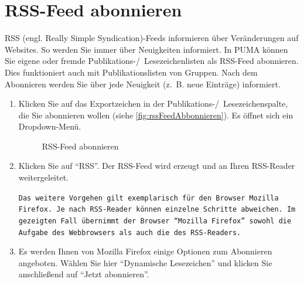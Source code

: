 \section{RSS-Feed abonnieren} 
\label{sec:rssFeedAbonnieren}
RSS (engl. Really Simple Syndication)-Feeds informieren über Veränderungen auf Websites. So werden Sie immer über Neuigkeiten informiert. In PUMA können Sie eigene oder fremde Publikations-/~Lesezeichenlisten als RSS-Feed abonnieren. Dies funktioniert auch mit Publikationslisten von Gruppen. Nach dem Abonnieren werden Sie über jede Neuigkeit (z.~B. neue Einträge) informiert. 
\begin{enumerate}
    \item Klicken Sie auf das Exportzeichen in der Publikations-/~Lesezeichenspalte, die Sie abonnieren wollen (siehe \autoref{fig:rssFeedAbbonnieren}). Es öffnet sich ein Dropdown-Menü.
\begin{figure}[h!]
 \centering
 \caption{RSS-Feed abonnieren}
 \label{fig:rssFeedAbbonnieren}
\end{figure}
    \item  Klicken Sie auf \enquote{RSS}. Der RSS-Feed wird erzeugt und an Ihren RSS-Reader weitergeleitet. 
\begin{mdframed}[style=mdfexample1,frametitle={\texttt{ACHTUNG}},backgroundcolor=gray!40]\texttt{Das weitere Vorgehen gilt exemplarisch für den Browser Mozilla Firefox. Je nach RSS-Reader können einzelne Schritte abweichen. Im gezeigten Fall übernimmt der Browser \enquote{Mozilla Firefox} sowohl die Aufgabe des Webbrowsers als auch die des RSS-Readers.}
\end{mdframed}
    \item Es werden Ihnen von Mozilla Firefox einige Optionen zum Abonnieren angeboten. Wählen Sie hier \enquote{Dynamische Lesezeichen} und klicken Sie anschließend auf \enquote{Jetzt abonnieren}.
\begin{figure}[h!]
 \centering

\end{figure}
\end{enumerate}
